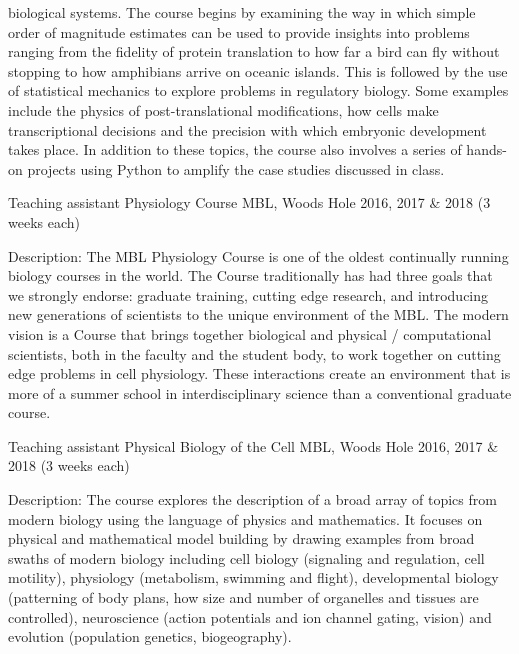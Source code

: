 \begin{cventries}
{\begin{cvitems}
{        biological systems. The course begins by examining the way in which
        simple order of magnitude estimates can be used to provide insights
        into problems ranging from the fidelity of protein translation to how
        far a bird can fly without stopping to how amphibians arrive on oceanic
        islands. This is followed by the use of statistical mechanics to
        explore problems in regulatory biology. Some examples include the
        physics of post-translational modifications, how cells make
        transcriptional decisions and the precision with which embryonic
        development takes place. In addition to these topics, the course also
        involves a series of hands-on projects using Python to amplify the case
        studies discussed in class.\\}
      \end{cvitems}
    }

  \cventry
    {Teaching assistant} %
    {Physiology Course} %
    {MBL, Woods Hole} %
    {2016, 2017 \& 2018 (3 weeks each)} %
    {
      \begin{cvitems} %
        \item {Description: The MBL Physiology Course is one of the oldest
        continually running biology courses in the world. The Course
        traditionally has had three goals that we strongly endorse: graduate
        training, cutting edge research, and introducing new generations of
        scientists to the unique environment of the MBL. The modern vision is a
        Course that brings together biological and physical / computational
        scientists, both in the faculty and the student body, to work together
        on cutting edge problems in cell physiology. These interactions create
        an environment that is more of a summer school in interdisciplinary
        science than a conventional graduate course.}
      \end{cvitems}
    }

  \cventry
    {Teaching assistant} %
    {Physical Biology of the Cell} %
    {MBL, Woods Hole} %
    {2016, 2017 \& 2018 (3 weeks each)} %
    {
      \begin{cvitems} %
        \item {Description: The course explores the description of a broad
        array of topics from modern biology using the language of physics and
        mathematics. It focuses on physical and mathematical model building by
        drawing examples from broad swaths of modern biology including cell
        biology (signaling and regulation, cell motility), physiology
        (metabolism, swimming and flight), developmental biology (patterning of
        body plans, how size and number of organelles and tissues are
        controlled), neuroscience (action potentials and ion channel gating,
        vision) and evolution (population genetics, biogeography).}
      \end{cvitems}
    }


\end{cventries}
